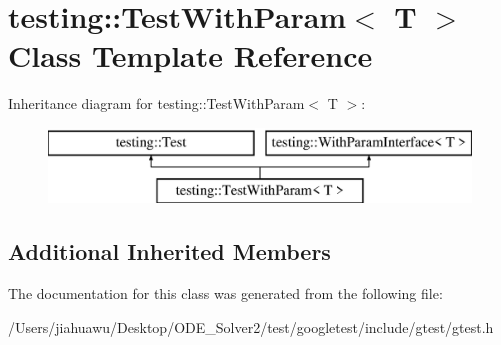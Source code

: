 \hypertarget{classtesting_1_1_test_with_param}{}\section{testing\+:\+:Test\+With\+Param$<$ T $>$ Class Template Reference}
\label{classtesting_1_1_test_with_param}
Inheritance diagram for testing\+:\+:Test\+With\+Param$<$ T $>$\+:\begin{figure}[H]
\begin{center}
\leavevmode
\includegraphics[height=2.000000cm]{classtesting_1_1_test_with_param}
\end{center}
\end{figure}
\subsection*{Additional Inherited Members}


The documentation for this class was generated from the following file\+:\begin{DoxyCompactItemize}
\item 
/\+Users/jiahuawu/\+Desktop/\+O\+D\+E\+\_\+\+Solver2/test/googletest/include/gtest/gtest.\+h\end{DoxyCompactItemize}
